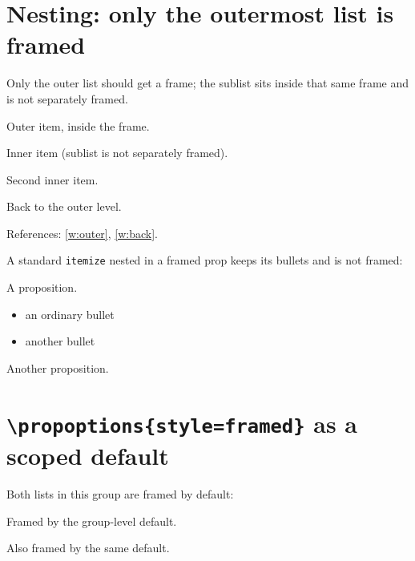 \documentclass{article}
\begin{document}
\section{Nesting: only the outermost list is framed}

Only the outer list should get a frame; the sublist sits inside that same
frame and is not separately framed.

\begin{prop}[style=framed]
  \item Outer item, inside the frame. \label{w:outer}
  \begin{prop}
    \item Inner item (sublist is not separately framed).
    \item Second inner item.
  \end{prop}
  \item Back to the outer level. \label{w:back}
\end{prop}

References: \ref{w:outer}, \ref{w:back}.

A standard \texttt{itemize} nested in a framed prop keeps its bullets and is
not framed:

\begin{prop}[style=framed]
  \item A proposition.
  \begin{itemize}
    \item an ordinary bullet
    \item another bullet
  \end{itemize}
  \item Another proposition.
\end{prop}

\section{\texttt{\textbackslash propoptions\{style=framed\}} as a scoped default}

\begingroup
{}

Both lists in this group are framed by default:

\begin{prop}
  \item Framed by the group-level default.
\end{prop}

\begin{prop}
  \item Also framed by the same default.
\end{prop}
\endgroup
\end{document}
